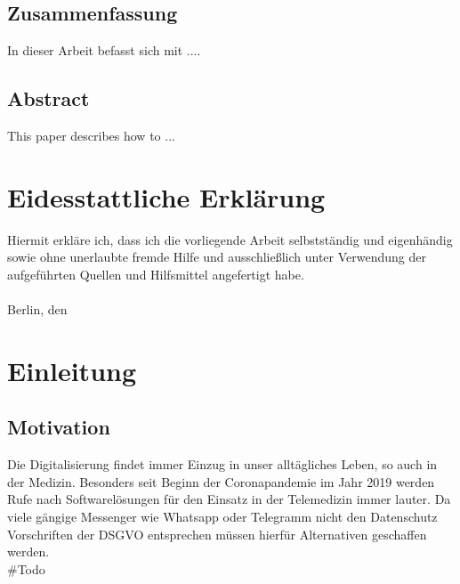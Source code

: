 \makeatother

\newcommand\ProcessThreeDashes{\llap{\color{cyan}\mdseries-{-}-}}




    \nocite{*}



    \frontmatter
    
    \hypersetup{pageanchor=false}

    \newpage
    \section*{Zusammenfassung}
    In dieser Arbeit befasst sich mit ....

    \section*{Abstract}\label{sec:abstract}
    This paper describes how to ...
    \newpage
    \chapter*{Eidesstattliche Erklärung}\label{ch:eidesstattliche-erklarung}
    Hiermit erkläre ich, dass ich die vorliegende Arbeit selbstständig und eigenhändig sowie ohne
    unerlaubte fremde Hilfe und ausschließlich unter Verwendung der aufgeführten Quellen und
    Hilfsmittel angefertigt habe.\\
    \vspace{1cm}\\
    Berlin, den \underline{\hspace{3cm}} \hfill \DeinName \underline{\hspace{4cm}}

    \newpage
    \tableofcontents

    \mainmatter

    \newpage
    \chapter{Einleitung}\label{ch:einleitung}

    \section{Motivation}\label{sec:motivation}
    Die Digitalisierung findet immer Einzug in unser alltägliches Leben, so auch in der Medizin.
    Besonders seit Beginn der Coronapandemie im Jahr 2019 werden Rufe nach Softwarelösungen für den Einsatz in der Telemedizin immer lauter.
    Da viele gängige Messenger wie Whatsapp oder Telegramm nicht den Datenschutz Vorschriften der DSGVO entsprechen müssen hierfür Alternativen geschaffen werden.\\
    \#Todo


